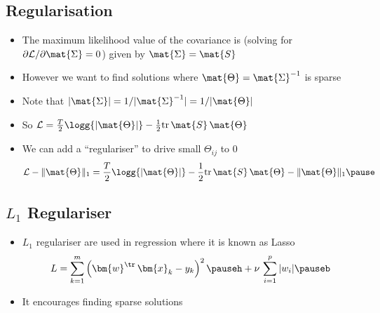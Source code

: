 \begin{slide}
\section[-2]{Regularisation}

\begin{PauseHighLight}
  \begin{itemize}
  \item The maximum likelihood value of the covariance is (solving for $\partial
    \mathcal{L}/\partial \mat{\Sigma}=0$) given by
    $\mat{\Sigma}=\mat{S}$\pause
  \item However we want to find solutions where $\mat{\Theta} =
    \mat{\Sigma}^{-1}$ is sparse\pause
  \item Note that $|\mat{\Sigma}| = 1/|\mat{\Sigma}^{-1}| =
    1/|\mat{\Theta}|$ \pause
  \item So $\mathcal{L} = \frac{T}{2} \logg{|\mat{\Theta}|}
    -\frac{1}{2} \mathrm{tr}\,  \mat{S}\,\mat{\Theta}$\pause
  \item We can add a ``regulariser'' to drive small $\Theta_{ij}$ to 0
    \begin{align*}
      \mathcal{L}  - \|\mat{\Theta}\|_1
      = \frac{T}{2} \logg{|\mat{\Theta}|} -\frac{1}{2} \mathrm{tr}\,
    \mat{S}\,\mat{\Theta} - \|\mat{\Theta}\|_1\pause
    \end{align*}
  \end{itemize}
\end{PauseHighLight}

\end{slide}



\begin{slide}
\section[-2.5]{$L_1$ Regulariser}

\pb
\begin{itemize}\squeeze
\item $L_1$ regulariser are used in regression where it is known as Lasso
  \begin{align*}
    L = \sum_{k=1}^m \left( \bm{w}^\tr \, \bm{x}_k - y_k \right)^2\pauseh
    + \nu \, \sum_{i=1}^p |w_i| \pauseb
  \end{align*}
\item It encourages finding sparse solutions\pauseh
  \begin{center}
    \pause
  \end{center}
\end{itemize}


\end{slide}



